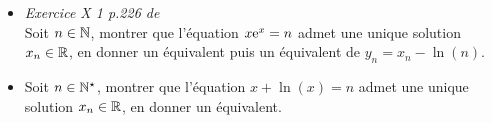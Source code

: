 \begin{itemize}
    \item \emph{Exercice X 1 p.226 de \cite{exos_oraux}}\\
    Soit $n \in \mathbb{N}$, montrer que l'équation $x \mathrm{e}^x = n$ admet une unique solution $x_n \in \mathbb{R}$, en donner un équivalent puis un équivalent de $y_n = x_n - \ln(n)$. 
    \item Soit $n \in \mathbb{N}^\star$, montrer que l'équation $x + \ln(x) = n$ admet une unique solution $x_n \in \mathbb{R}$, en donner un équivalent.
\end{itemize}